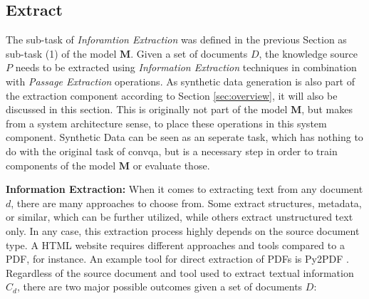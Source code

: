 


\subsection{Extract}
\label{subsec:extract}

The sub-task of \textit{Inforamtion Extraction} was defined in the previous Section as sub-task (1) of the model $\mathbf{M}$. Given a set of documents $D$, the knowledge source $P$ needs to be extracted using \textit{Information Extraction} techniques in combination with \textit{Passage Extraction} operations. As synthetic data generation is also part of the extraction component according to Section \ref{sec:overview}, it will also be discussed in this section. This is originally not part of the model $\mathbf{M}$, but makes from a system architecture sense, to place these operations in this system component. Synthetic Data can be seen as an seperate task, which has nothing to do with the original task of \gls{convqa}, but is a necessary step in order to train components of the model $\mathbf{M}$ or evaluate those.

\vspace{\baselineskip} %

\textbf{Information Extraction:} When it comes to extracting text from any document $d$, there are many approaches to choose from. Some extract structures, metadata, or similar, which can be further utilized, while others extract unstructured text only. In any case, this extraction process highly depends on the source document type. A HTML website requires different approaches and tools compared to a PDF, for instance. An example tool for direct extraction of PDFs is Py2PDF \cite{noauthor_welcome_nodate}. Regardless of the source document and tool used to extract textual information $C_d$, there are two major possible outcomes given a set of documents $D$:

